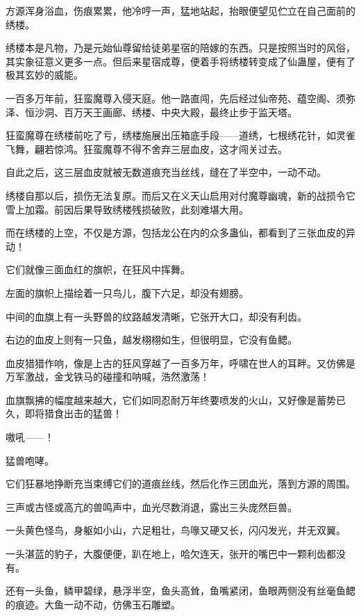 
\begin{this_body}



方源浑身浴血，伤痕累累，他冷哼一声，猛地站起，抬眼便望见伫立在自己面前的绣楼。

绣楼本是凡物，乃是元始仙尊留给徒弟星宿的陪嫁的东西。只是按照当时的风俗，其实象征意义更多一点。但后来星宿成尊，便着手将绣楼转变成了仙蛊屋，便有了极其玄妙的威能。

一百多万年前，狂蛮魔尊入侵天庭。他一路直闯，先后经过仙帝苑、蕴空阁、须弥泽、恒沙洞、百万天王画廊、绣楼、中央大殿，最终止步于监天塔。

狂蛮魔尊在绣楼前吃了亏，绣楼施展出压箱底手段——道绣，七根绣花针，如灵雀飞舞，翩若惊鸿。狂蛮魔尊不得不舍弃三层血皮，这才闯关过去。

自此之后，这三层血皮就被无数道痕充当丝线，缝在了半空中，一动不动。

绣楼自那以后，损伤无法复原。而后又在义天山启用对付魔尊幽魂，新的战损令它雪上加霜。前因后果导致绣楼残损破败，此刻难堪大用。

而在绣楼的上空，不仅是方源，包括龙公在内的众多蛊仙，都看到了三张血皮的异动！

它们就像三面血红的旗帜，在狂风中挥舞。

左面的旗帜上描绘着一只鸟儿，腹下六足，却没有翅膀。

中间的血旗上有一头野兽的纹路越发清晰，它张开大口，却没有利齿。

右边的血皮上则有一只鱼，越发栩栩如生，但很明显，它没有鱼鳃。

血皮猎猎作响，像是上古的狂风穿越了一百多万年，呼啸在世人的耳畔。又仿佛是万军激战，金戈铁马的碰撞和呐喊，浩然激荡！

血旗飘拂的幅度越来越大，它们如同忍耐万年终要喷发的火山，又好像是蓄势已久，即将猎食出击的猛兽！

嗷吼——！

猛兽咆哮。

它们狂暴地挣断充当束缚它们的道痕丝线，然后化作三团血光，落到方源的周围。

三声或古怪或高亢的兽鸣声中，血光尽数消退，露出三头庞然巨兽。

一头黄色怪鸟，身躯如小山，六足粗壮，鸟喙又硬又长，闪闪发光，并无双翼。

一头湛蓝的豹子，大腹便便，趴在地上，哈欠连天，张开的嘴巴中一颗利齿都没有。

还有一头鱼，鳞甲碧绿，悬浮半空，鱼头高耸，鱼嘴紧闭，鱼眼两侧没有丝毫鱼鳃的痕迹。大鱼一动不动，仿佛玉石雕塑。


\end{this_body}
